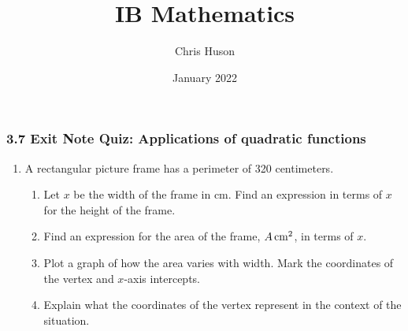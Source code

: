 \documentclass[12pt, twoside]{article}
\title{IB Mathematics}
\author{Chris Huson}
\date{January 2022}
\begin{document}
\subsubsection*{3.7 Exit Note Quiz: Applications of quadratic functions}
\begin{enumerate}
\item A rectangular picture frame has a perimeter of 320 centimeters.
    \begin{enumerate}
        \item Let $x$ be the width of the frame in cm. Find an expression in terms of $x$ for the height of the frame. \vspace{2cm}
        \item Find an expression for the area of the frame, $A \,\rm{cm}^2$, in terms of $x$.  \vspace{2cm}
        \item Plot a graph of how the area varies with width. Mark the coordinates of the vertex and $x$-axis intercepts.
        \item Explain what the coordinates of the vertex represent in the context of the situation. \vspace{4cm}
    \end{enumerate}
    \begin{center}
    \end{center}
    

\end{enumerate}
\end{document}
